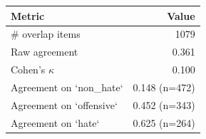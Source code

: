 \begin{tabular}{lr}
\toprule
Metric & Value \\
\midrule
\# overlap items & 1079 \\
Raw agreement & 0.361 \\
Cohen's $\kappa$ & 0.100 \\
Agreement on `non_hate` & 0.148 (n=472) \\
Agreement on `offensive` & 0.452 (n=343) \\
Agreement on `hate` & 0.625 (n=264) \\
\bottomrule
\end{tabular}